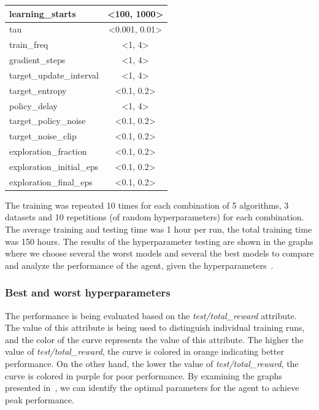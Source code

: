 \documentclass[../xlapes02]{subfiles}
\begin{document}
\begin{center}
\begin{tabular}{|l|c|}
            learning\_starts          & <100, 1000>                                     \\ \hline
            tau                       & <0.001, 0.01>                                   \\ \hline
            train\_freq               & <1, 4>                                          \\ \hline
            gradient\_steps           & <1, 4>                                          \\ \hline
            target\_update\_interval  & <1, 4>                                          \\ \hline
            target\_entropy           & <0.1, 0.2>                                      \\ \hline
            policy\_delay             & <1, 4>                                          \\ \hline
            target\_policy\_noise     & <0.1, 0.2>                                      \\ \hline
            target\_noise\_clip       & <0.1, 0.2>                                      \\ \hline
            exploration\_fraction     & <0.1, 0.2>                                      \\ \hline
            exploration\_initial\_eps & <0.1, 0.2>                                      \\ \hline
            exploration\_final\_eps   & <0.1, 0.2>                                      \\ \hline
        \end{tabular}
    \end{center}

    The training was repeated 10 times for each combination of 5 algorithms, 3 datasets and 10 repetitions (of random hyperparameters) for each combination. The average training and testing time was 1 hour per run, the total training time was 150 hours. The results of the hyperparameter testing are shown in the graphs where we choose several the worst models and several the best models to compare and analyze the performance of the agent, given the hyperparameters~.

    \subsubsection{Best and worst hyperparameters}\label{subsubsec:best-and-worst-hyperparameters}
    The performance is being evaluated based on the \emph{test/total\_reward} attribute. The value of this attribute is being used to distinguish individual training runs, and the color of the curve represents the value of this attribute. The higher the value of \emph{test/total\_reward}, the curve is colored in \textcolor[RGB]{255,128,0}{orange} indicating better performance. On the other hand, the lower the value of \emph{test/total\_reward}, the curve is colored in \textcolor[RGB]{100,0,200}{purple} for poor performance. By examining the graphs presented in~, we can identify the optimal parameters for the agent to achieve peak performance.
\end{document}

